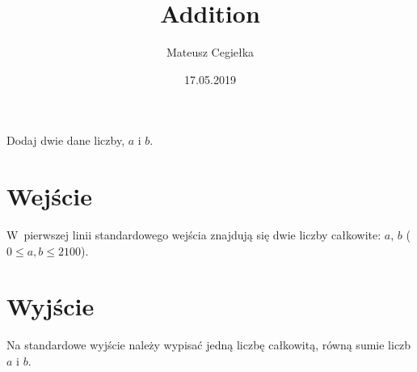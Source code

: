 \documentclass[zad,zawodnik,utf8]{sinol}
\title{Addition}
\author{Mateusz Cegiełka}
\date{17.05.2019}
\begin{document}
\begin{tasktext}%

Dodaj dwie dane liczby, $a$ i $b$.

\section{Wejście}

W~pierwszej linii standardowego wejścia znajdują się dwie liczby całkowite: $a$, $b$ ($0 \le a, b \le 2 100$).

\section{Wyjście}

Na standardowe wyjście należy wypisać jedną liczbę całkowitą, równą sumie liczb $a$ i $b$.

\makecompactexample

\end{tasktext}
\end{document}
